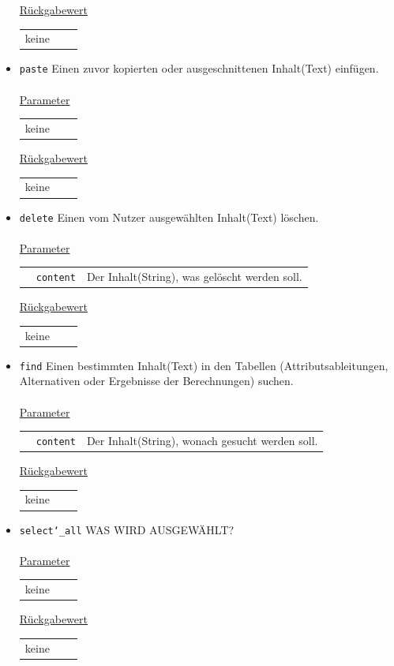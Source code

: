 \documentclass{article}
\begin{document}
\begin{itemize}
\underline{{Rückgabewert}}
\begin{tabular}{lll}
keine
\end{tabular}

\item \texttt{paste} \newline Einen zuvor kopierten oder ausgeschnittenen Inhalt(Text) einfügen.
\\\\

\underline{{Parameter}} 
\begin{tabular}{lll}
keine
\end{tabular}

\underline{{Rückgabewert}}
\begin{tabular}{lll}
keine
\end{tabular}

\item \texttt{delete} \newline Einen vom Nutzer ausgewählten Inhalt(Text) löschen.
\\\\

\underline{{Parameter}} 
\begin{tabular}{lll}
& \texttt{content} & Der Inhalt(String), was gelöscht werden soll. \\
\end{tabular}

\underline{{Rückgabewert}}
\begin{tabular}{lll}
keine
\end{tabular}

\item \texttt{find} \newline Einen bestimmten Inhalt(Text) in den Tabellen (Attributsableitungen, Alternativen oder Ergebnisse der Berechnungen) suchen.
\\\\

\underline{{Parameter}} 
\begin{tabular}{lll}
 & \texttt{content} & Der Inhalt(String), wonach gesucht werden soll. \\
\end{tabular}

\underline{{Rückgabewert}}
\begin{tabular}{lll}
 keine
\end{tabular}

\item \texttt{select\char`_all} \newline WAS WIRD AUSGEWÄHLT?
\\\\

\underline{{Parameter}} 
\begin{tabular}{lll}
keine
\end{tabular}

\underline{{Rückgabewert}}
\begin{tabular}{lll}
 keine
\end{tabular}
\end{itemize}
\end{document}
